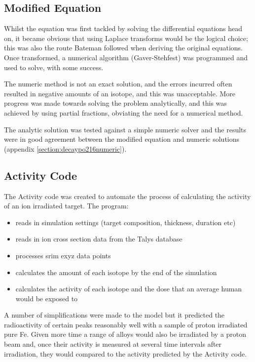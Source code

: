 \subsection{Modified Equation}

Whilst the equation was first tackled by solving the differential equations head on, it became obvious that using Laplace transforms would be the logical choice; this was also the route Bateman followed when deriving the original equations.  Once transformed, a numerical algorithm (Gaver-Stehfest) was programmed and used to solve, with some success.  

The numeric method is not an exact solution, and the errors incurred often resulted in negative amounts of an isotope, and this was unacceptable.  More progress was made towards solving the problem analytically, and this was achieved by using partial fractions, obviating the need for a numerical method. 

The analytic solution was tested against a simple numeric solver and the results were in good agreement between the modified equation and numeric solutions (appendix \ref{section:decaypo216numeric}).

\subsection{Activity Code}

The Activity code was created to automate the process of calculating the activity of an ion irradiated target.  The program:

\begin{itemize}
\item reads in simulation settings (target composition, thickness, duration etc)
\item reads in ion cross section data from the Talys database
\item processes \acrshort{srim} exyz data points
\item calculates the amount of each isotope by the end of the simulation
\item calculates the activity of each isotope and the dose that an average human would be exposed to
\end{itemize}

A number of simplifications were made to the model but it predicted the radioactivity of certain peaks reasonably well with a sample of proton irradiated pure Fe.  Given more time a range of alloys would also be irradiated by a proton beam and, once their activity is measured at several time intervals after irradiation, they would compared to the activity predicted by the Activity code.

